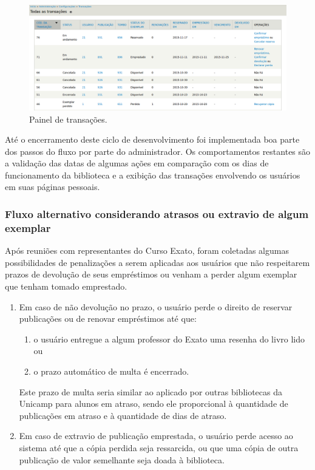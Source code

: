 \documentclass[a4paper]{article}
\begin{document}
\begin{figure}[pbth!]
\centering
\includegraphics[width=140mm, trim={35mm 0 30mm 20mm}, clip]{img/transactions.png}
\caption{Painel de transações.\label{transactions}}
\end{figure}

Até o encerramento deste ciclo de desenvolvimento foi implementada boa parte dos passos do fluxo por parte do administrador. Os comportamentos restantes são a validação das datas de algumas ações em comparação com os dias de funcionamento da biblioteca e a exibição das transações envolvendo os usuários em suas páginas pessoais.

\subsubsection{Fluxo alternativo considerando atrasos ou extravio de algum exemplar}\label{sssec:overdue_or_lost}
Após reuniões com representantes do Curso Exato, foram coletadas algumas possibilidades de penalizações a serem aplicadas aos usuários que não respeitarem prazos de devolução de seus empréstimos ou venham a perder algum exemplar que tenham tomado emprestado.

\begin{enumerate}
\item Em caso de não devolução no prazo, o usuário perde o direito de reservar publicações ou de renovar empréstimos até que:
\begin{enumerate}
\item \label{itm:option1} o usuário entregue a algum professor do Exato uma resenha do livro lido ou
\item \label{itm:option2} o prazo automático de multa é encerrado.
\end{enumerate}
Este prazo de multa seria similar ao aplicado por outras bibliotecas da Unicamp para alunos em atraso, sendo ele proporcional à quantidade de publicações em atraso e à quantidade de dias de atraso.

\item \label{itm:option3} Em caso de extravio de publicação emprestada, o usuário perde acesso ao sistema até que a cópia perdida seja ressarcida, ou que uma cópia de outra publicação de valor semelhante seja doada à biblioteca.
\end{enumerate}
\end{document}
